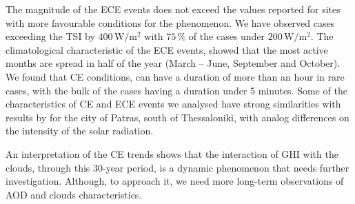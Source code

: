 \documentclass[preprint, 5p,
authoryear]{elsarticle} %
\begin{document}
The magnitude of the ECE events does not exceed the values reported for
sites with more favourable conditions for the phenomenon. We have
observed cases exceeding the TSI by \(400\,\text{W}/\text{m}^{2}\) with
\(75\,\%\) of the cases under \(200\,\text{W}/\text{m}^{2}\). The
climatological characteristic of the ECE events, showed that the most
active months are spread in half of the year (March -- June, September
and October). We found that CE conditions, can have a duration of more
than an hour in rare cases, with the bulk of the cases having a duration
under 5 minutes. Some of the characteristics of CE and ECE events we
analysed have strong similarities with results by \citet{Vamvakas2020}
for the city of Patras, south of Thessaloniki, with analog differences
on the intensity of the solar radiation.

An interpretation of the CE trends shows that the interaction of GHI
with the clouds, through this 30-year period, is a dynamic phenomenon
that needs further investigation. Although, to approach it, we need more
long-term observations of AOD and clouds characteristics.


\end{document}
